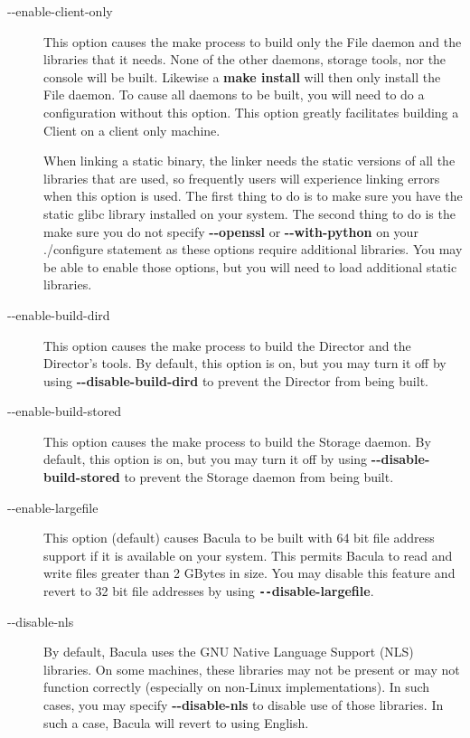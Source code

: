 \begin{description}
\item [ {-}{-}enable-client-only]
   This option causes the make process to build only the File daemon and
   the libraries that it needs.  None of the other daemons, storage tools,
   nor the console will be built.  Likewise a {\bf make install} will then
   only install the File daemon.  To cause all daemons to be built, you
   will need to do a configuration without this option.  This option
   greatly facilitates building a Client on a client only machine.

   When linking a static binary, the linker needs the static versions
   of all the libraries that are used, so frequently users will 
   experience linking errors when this option is used. The first 
   thing to do is to make sure you have the static glibc library 
   installed on your system. The second thing to do is the make sure
   you do not specify {\bf {-}{-}openssl} or {\bf {-}{-}with-python}
   on your ./configure statement as these options require additional
   libraries. You may be able to enable those options, but you will
   need to load additional static libraries.

\item [ {-}{-}enable-build-dird]
   This option causes the make process to build the Director and the
   Director's tools. By default, this option is on, but you may turn
   it off by using {\bf {-}{-}disable-build-dird} to prevent the
   Director from being built.

\item [ {-}{-}enable-build-stored]
   This option causes the make process to build the Storage daemon.
   By default, this option is on, but you may turn
   it off by using {\bf {-}{-}disable-build-stored} to prevent the
   Storage daemon from being built.


\item [ {-}{-}enable-largefile]
   This option (default) causes  Bacula to be built with 64 bit file address
   support if it  is available on your system. This permits Bacula to read and 
   write files greater than 2 GBytes in size. You may disable this  feature and
   revert to 32 bit file addresses by using  {\bf \verb:--:disable-largefile}.  

\item [ {-}{-}disable-nls]
   By default, Bacula uses the GNU Native Language Support (NLS) libraries. On
   some machines, these libraries may not be present or may not function 
   correctly (especially on non-Linux implementations). In such cases, you
   may specify {\bf {-}{-}disable-nls} to disable use of those libraries.
   In such a case, Bacula will revert to using English.


\end{description}
